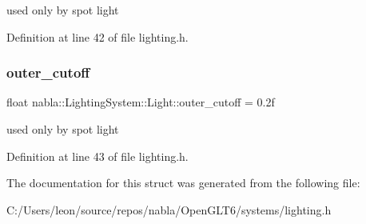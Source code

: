 used only by spot light 

Definition at line 42 of file lighting.\+h.

\mbox{\label{structnabla_1_1_lighting_system_1_1_light_a0fe9cc1ef09cf930bf76017056759897}} 
\subsubsection{\texorpdfstring{outer\_cutoff}{outer\_cutoff}}
{\footnotesize\ttfamily float nabla\+::\+Lighting\+System\+::\+Light\+::outer\+\_\+cutoff = 0.\+2f}

used only by spot light 

Definition at line 43 of file lighting.\+h.



The documentation for this struct was generated from the following file\+:\begin{DoxyCompactItemize}
\item 
C\+:/\+Users/leon/source/repos/nabla/\+Open\+G\+L\+T6/systems/lighting.\+h\end{DoxyCompactItemize}
